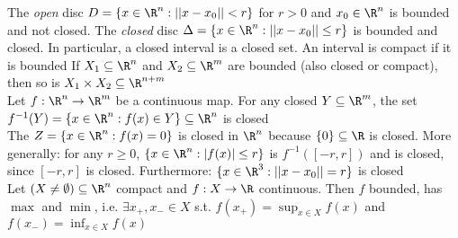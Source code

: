  The \textit{open} disc $D = \{ x \in \R^n : ||x - x_0|| < r \}$ for $r > 0$ and $x_0 \in \R^n$ is bounded and not closed.
 The \textit{closed} disc $\Delta = \{ x \in \R^n : ||x - x_0|| \leq r \}$ is bounded and closed. In particular, a closed interval is a closed set.
An interval is compact if it is bounded
 If $X_1 \subseteq \R^n$ and $X_2 \subseteq \R^m$ are bounded (also closed or compact), then so is $X_1 \times X_2 \subseteq \R^{n + m}$\\
\shortproposition Let $f: \R^n \rightarrow \R^m$ be a continuous map. For any closed $Y \subseteq \R^m$,
the set $f^{-1}(Y) = \{ x \in \R^n : f(x) \in Y \} \subseteq \R^n$ is closed\\
\shortex The  $Z = \{ x\in \R^n : f(x) = 0 \}$ is closed in $\R^n$ because $\{ 0 \} \subseteq \R$ is closed.
More generally: for any $r \geq 0$, $\{ x \in \R^n : |f(x)| \leq r \}$ is $f^{-1}([-r, r])$ and is closed, since $[-r, r]$ is closed.
Furthermore: $\{ x\in \R^3 : ||x - x_0|| = r \}$ is closed\\
\shorttheorem Let $(X \neq \emptyset) \subseteq \R^n$ compact and $f: X \rightarrow \R$ continuous. 
Then $f$ bounded, has $\max$ and $\min$, i.e. $\exists x_+, x_- \in X$ s.t. $\displaystyle f(x_+) = \sup_{x \in X} f(x)$ and $\displaystyle f(x_-) = \inf_{x \in X} f(x)$
